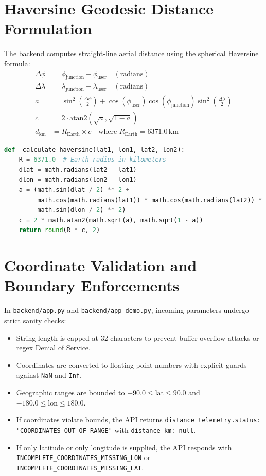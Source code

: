 \documentclass[11pt,a4paper,oneside]{report}
\begin{document}
\section{Haversine Geodesic Distance Formulation}
The backend computes straight-line aerial distance using the spherical Haversine formula:
\begin{align}
\Delta\phi &= \phi_{\text{junction}} - \phi_{\text{user}} \quad (\text{radians}) \\
\Delta\lambda &= \lambda_{\text{junction}} - \lambda_{\text{user}} \quad (\text{radians}) \\
a &= \sin^2\left(\frac{\Delta\phi}{2}\right) + \cos(\phi_{\text{user}}) \cos(\phi_{\text{junction}}) \sin^2\left(\frac{\Delta\lambda}{2}\right) \\
c &= 2 \cdot \text{atan2}\left(\sqrt{a}, \sqrt{1 - a}\right) \\
d_{\text{km}} &= R_{\text{Earth}} \times c \quad \text{where } R_{\text{Earth}} = 6371.0\,\text{km}
\end{align}

\begin{lstlisting}[language=Python,caption={Haversine Distance Implementation in Python}]
def _calculate_haversine(lat1, lon1, lat2, lon2):
    R = 6371.0  # Earth radius in kilometers
    dlat = math.radians(lat2 - lat1)
    dlon = math.radians(lon2 - lon1)
    a = (math.sin(dlat / 2) ** 2 +
         math.cos(math.radians(lat1)) * math.cos(math.radians(lat2)) *
         math.sin(dlon / 2) ** 2)
    c = 2 * math.atan2(math.sqrt(a), math.sqrt(1 - a))
    return round(R * c, 2)
\end{lstlisting}

\section{Coordinate Validation and Boundary Enforcements}
In \texttt{backend/app.py} and \texttt{backend/app\_demo.py}, incoming parameters undergo strict sanity checks:
\begin{itemize}[leftmargin=*]
    \item String length is capped at 32 characters to prevent buffer overflow attacks or regex Denial of Service.
    \item Coordinates are converted to floating-point numbers with explicit guards against \texttt{NaN} and \texttt{Inf}.
    \item Geographic ranges are bounded to $-90.0 \le \text{lat} \le 90.0$ and $-180.0 \le \text{lon} \le 180.0$.
    \item If coordinates violate bounds, the API returns \texttt{distance\_telemetry.status: "COORDINATES\_OUT\_OF\_RANGE"} with \texttt{distance\_km: null}.
    \item If only latitude or only longitude is supplied, the API responds with \texttt{INCOMPLETE\_COORDINATES\_MISSING\_LON} or \texttt{INCOMPLETE\_COORDINATES\_MISSING\_LAT}.
\end{itemize}
\end{document}
